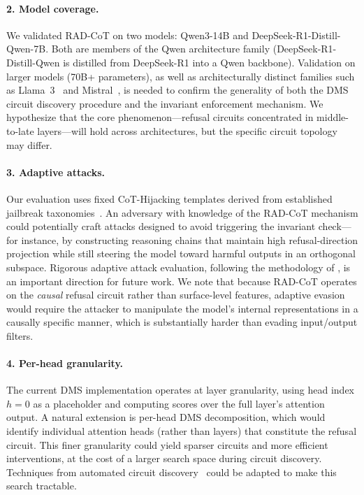 \documentclass[11pt]{article}
\begin{document}
\paragraph{2. Model coverage.}
We validated RAD-CoT on two models: Qwen3-14B and DeepSeek-R1-Distill-Qwen-7B. Both are members of the Qwen architecture family (DeepSeek-R1-Distill-Qwen is distilled from DeepSeek-R1 into a Qwen backbone). Validation on larger models (70B+ parameters), as well as architecturally distinct families such as Llama~3~\citep{meta2024llama3} and Mistral~\citep{jiang2023mistral}, is needed to confirm the generality of both the DMS circuit discovery procedure and the invariant enforcement mechanism. We hypothesize that the core phenomenon---refusal circuits concentrated in middle-to-late layers---will hold across architectures, but the specific circuit topology may differ.

\paragraph{3. Adaptive attacks.}
Our evaluation uses fixed CoT-Hijacking templates derived from established jailbreak taxonomies~\citep{zou2023universal, liu2024autodan, chao2023jailbreaking}. An adversary with knowledge of the RAD-CoT mechanism could potentially craft attacks designed to avoid triggering the invariant check---for instance, by constructing reasoning chains that maintain high refusal-direction projection while still steering the model toward harmful outputs in an orthogonal subspace. Rigorous adaptive attack evaluation, following the methodology of \citet{mazeika2024harmbench}, is an important direction for future work. We note that because RAD-CoT operates on the \emph{causal} refusal circuit rather than surface-level features, adaptive evasion would require the attacker to manipulate the model's internal representations in a causally specific manner, which is substantially harder than evading input/output filters.

\paragraph{4. Per-head granularity.}
The current DMS implementation operates at layer granularity, using head index $h=0$ as a placeholder and computing scores over the full layer's attention output. A natural extension is per-head DMS decomposition, which would identify individual attention heads (rather than layers) that constitute the refusal circuit. This finer granularity could yield sparser circuits and more efficient interventions, at the cost of a larger search space during circuit discovery. Techniques from automated circuit discovery~\citep{conmy2023automated} could be adapted to make this search tractable.
\end{document}
